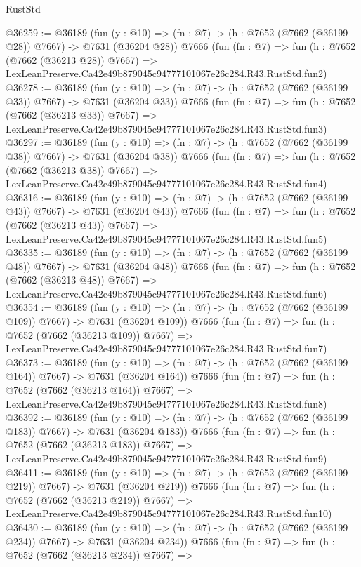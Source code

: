 \begin{lexlean}{RustStd}
\begin{coremodule}
@36259 := @36189
    (fun (y : @10) => (fn : @7) -> (h : @7652 (@7662 (@36199 @28)) @7667) -> @7631 (@36204 @28))
    @7666
    (fun (fn : @7) =>
    fun (h : @7652 (@7662 (@36213 @28)) @7667) =>
    LexLeanPreserve.Ca42e49b879045c94777101067e26c284.R43.RustStd.fun2)
@36278 := @36189
    (fun (y : @10) => (fn : @7) -> (h : @7652 (@7662 (@36199 @33)) @7667) -> @7631 (@36204 @33))
    @7666
    (fun (fn : @7) =>
    fun (h : @7652 (@7662 (@36213 @33)) @7667) =>
    LexLeanPreserve.Ca42e49b879045c94777101067e26c284.R43.RustStd.fun3)
@36297 := @36189
    (fun (y : @10) => (fn : @7) -> (h : @7652 (@7662 (@36199 @38)) @7667) -> @7631 (@36204 @38))
    @7666
    (fun (fn : @7) =>
    fun (h : @7652 (@7662 (@36213 @38)) @7667) =>
    LexLeanPreserve.Ca42e49b879045c94777101067e26c284.R43.RustStd.fun4)
@36316 := @36189
    (fun (y : @10) => (fn : @7) -> (h : @7652 (@7662 (@36199 @43)) @7667) -> @7631 (@36204 @43))
    @7666
    (fun (fn : @7) =>
    fun (h : @7652 (@7662 (@36213 @43)) @7667) =>
    LexLeanPreserve.Ca42e49b879045c94777101067e26c284.R43.RustStd.fun5)
@36335 := @36189
    (fun (y : @10) => (fn : @7) -> (h : @7652 (@7662 (@36199 @48)) @7667) -> @7631 (@36204 @48))
    @7666
    (fun (fn : @7) =>
    fun (h : @7652 (@7662 (@36213 @48)) @7667) =>
    LexLeanPreserve.Ca42e49b879045c94777101067e26c284.R43.RustStd.fun6)
@36354 := @36189
    (fun (y : @10) => (fn : @7) -> (h : @7652 (@7662 (@36199 @109)) @7667) -> @7631 (@36204 @109))
    @7666
    (fun (fn : @7) =>
    fun (h : @7652 (@7662 (@36213 @109)) @7667) =>
    LexLeanPreserve.Ca42e49b879045c94777101067e26c284.R43.RustStd.fun7)
@36373 := @36189
    (fun (y : @10) => (fn : @7) -> (h : @7652 (@7662 (@36199 @164)) @7667) -> @7631 (@36204 @164))
    @7666
    (fun (fn : @7) =>
    fun (h : @7652 (@7662 (@36213 @164)) @7667) =>
    LexLeanPreserve.Ca42e49b879045c94777101067e26c284.R43.RustStd.fun8)
@36392 := @36189
    (fun (y : @10) => (fn : @7) -> (h : @7652 (@7662 (@36199 @183)) @7667) -> @7631 (@36204 @183))
    @7666
    (fun (fn : @7) =>
    fun (h : @7652 (@7662 (@36213 @183)) @7667) =>
    LexLeanPreserve.Ca42e49b879045c94777101067e26c284.R43.RustStd.fun9)
@36411 := @36189
    (fun (y : @10) => (fn : @7) -> (h : @7652 (@7662 (@36199 @219)) @7667) -> @7631 (@36204 @219))
    @7666
    (fun (fn : @7) =>
    fun (h : @7652 (@7662 (@36213 @219)) @7667) =>
    LexLeanPreserve.Ca42e49b879045c94777101067e26c284.R43.RustStd.fun10)
@36430 := @36189
    (fun (y : @10) => (fn : @7) -> (h : @7652 (@7662 (@36199 @234)) @7667) -> @7631 (@36204 @234))
    @7666
    (fun (fn : @7) =>
    fun (h : @7652 (@7662 (@36213 @234)) @7667) =>

\end{coremodule}
\end{lexlean}

